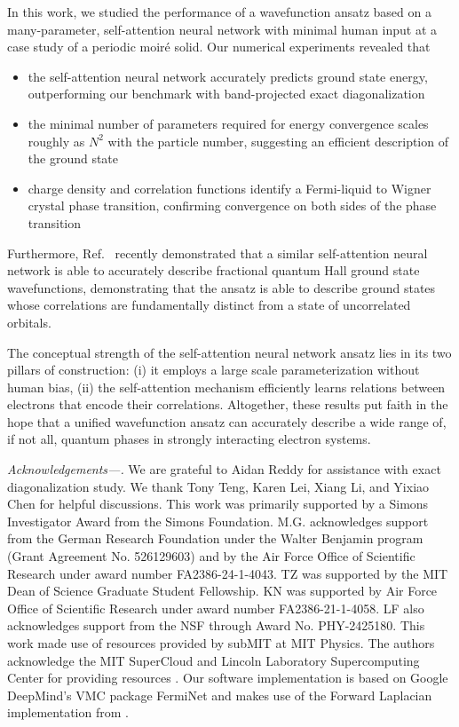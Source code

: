 \documentclass[
 reprint,
 amsmath,amssymb,
 aps, prx,
floatfix,longbibliography,
]{revtex4-2}
\begin{document}
In this work, we studied the performance of a wavefunction ansatz based on a many-parameter, self-attention neural network with minimal human input at a case study of a periodic moir\'e solid. Our numerical experiments revealed that
\begin{itemize}
    \item the self-attention neural network accurately predicts ground state energy, outperforming our benchmark with band-projected exact diagonalization 
    \item the minimal number of parameters required for energy convergence scales roughly as $N^2$ with the particle number, suggesting an efficient description of the ground state
    \item charge density and correlation functions identify a Fermi-liquid to Wigner crystal phase transition, confirming convergence on both sides of the phase transition
\end{itemize}
Furthermore, Ref.~\cite{Teng2024Nov} recently demonstrated that a similar self-attention neural network is able to accurately describe fractional quantum Hall ground state wavefunctions, demonstrating that the ansatz is able to describe ground states whose correlations are fundamentally distinct from a state of uncorrelated orbitals.

The conceptual strength of the self-attention neural network ansatz lies in its two pillars of construction: (i) it employs a large scale parameterization without human bias, (ii) the self-attention mechanism efficiently learns relations between electrons that encode their correlations. 
Altogether, these results put faith in the hope that a unified wavefunction ansatz can accurately describe a wide range of, if not all, quantum phases in strongly interacting electron systems. 


{\it Acknowledgements---.} We are grateful to Aidan Reddy for assistance with exact diagonalization study. We thank Tony Teng, Karen Lei, Xiang Li, and Yixiao Chen for helpful discussions. This work was primarily supported by a Simons Investigator Award from the Simons Foundation. M.G. acknowledges support from the German Research
Foundation under the Walter Benjamin program (Grant
Agreement No. 526129603) and by the Air Force Office of Scientific Research under award number FA2386-24-1-4043.
TZ was supported by the MIT Dean of Science Graduate Student Fellowship.  KN was supported by Air Force Office of Scientific Research under award number FA2386-21-1-4058. LF also acknowledges support from the NSF through Award No. PHY-2425180. 
This work made use of resources provided by subMIT at MIT Physics.
The authors acknowledge the MIT SuperCloud and Lincoln Laboratory Supercomputing Center for providing resources \cite{reuther2018interactive}.
 Our software implementation is based on Google DeepMind's VMC package FermiNet \cite{ferminet_github} and makes use of the Forward Laplacian \cite{Li2023JulForwardLaplacian} implementation from \cite{fwdlap_github}.
\end{document}
